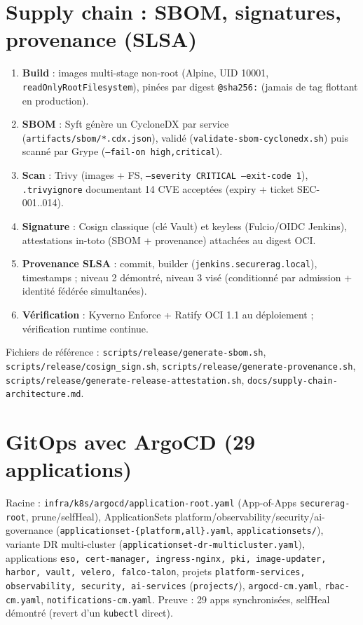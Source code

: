 \documentclass[12pt,a4paper,openany]{report}
\begin{document}
\section{Supply chain : SBOM, signatures, provenance (SLSA)}

\begin{enumerate}
  \item \textbf{Build} : images multi-stage non-root (Alpine, UID 10001, \texttt{readOnlyRootFilesystem}),
  pinées par digest \texttt{@sha256:} (jamais de tag flottant en production).
  \item \textbf{SBOM} : Syft génère un CycloneDX par service (\texttt{artifacts/sbom/*.cdx.json}),
  validé (\texttt{validate-sbom-cyclonedx.sh}) puis scanné par Grype (\texttt{--fail-on high,critical}).
  \item \textbf{Scan} : Trivy (images + FS, \texttt{--severity CRITICAL --exit-code 1}),
  \texttt{.trivyignore} documentant 14 CVE acceptées (expiry + ticket SEC-001..014).
  \item \textbf{Signature} : Cosign classique (clé Vault) et keyless (Fulcio/OIDC Jenkins),
  attestations in-toto (SBOM + provenance) attachées au digest OCI.
  \item \textbf{Provenance SLSA} : commit, builder (\texttt{jenkins.securerag.local}), timestamps ;
  niveau 2 démontré, niveau 3 visé (conditionné par admission + identité fédérée simultanées).
  \item \textbf{Vérification} : Kyverno Enforce + Ratify OCI 1.1 au déploiement ;
  vérification runtime continue.
\end{enumerate}

Fichiers de référence : \texttt{scripts/release/generate-sbom.sh},
\texttt{scripts/release/cosign\_sign.sh}, \texttt{scripts/release/generate-provenance.sh},
\texttt{scripts/release/generate-release-attestation.sh},
\texttt{docs/supply-chain-architecture.md}.

\section{GitOps avec ArgoCD (29 applications)}

Racine : \texttt{infra/k8s/argocd/application-root.yaml} (App-of-Apps \texttt{securerag-root},
prune/selfHeal), ApplicationSets platform/observability/security/ai-governance
(\texttt{applicationset-\{platform,all\}.yaml}, \texttt{applicationsets/}),
variante DR multi-cluster (\texttt{applicationset-dr-multicluster.yaml}),
applications \texttt{eso, cert-manager, ingress-nginx, pki, image-updater, harbor, vault, velero, falco-talon},
projets \texttt{platform-services, observability, security, ai-services}
(\texttt{projects/}), \texttt{argocd-cm.yaml}, \texttt{rbac-cm.yaml}, \texttt{notifications-cm.yaml}.
Preuve : 29 apps synchronisées, selfHeal démontré (revert d'un \texttt{kubectl} direct).
\end{document}
